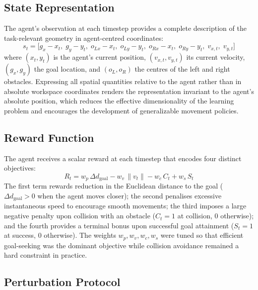 \documentclass{article}
\begin{document}
\subsection{State Representation}

The agent's observation at each timestep provides a complete description
of the task-relevant geometry in agent-centred coordinates:
\begin{equation}
  s_t = \bigl[
    g_x - x_t,\;g_y - y_t,\;
    o_{Lx} - x_t,\;o_{Ly} - y_t,\;
    o_{Rx} - x_t,\;o_{Ry} - y_t,\;
    v_{x,t},\;v_{y,t}
  \bigr]
  \label{eq:state}
\end{equation}
where $(x_t,y_t)$ is the agent's current position, $(v_{x,t},v_{y,t})$
its current velocity, $(g_x,g_y)$ the goal location, and $(o_L,o_R)$ the
centres of the left and right obstacles.
Expressing all spatial quantities relative to the agent rather than in
absolute workspace coordinates renders the representation invariant to the
agent's absolute position, which reduces the effective dimensionality of
the learning problem and encourages the development of generalizable
movement policies.

\subsection{Reward Function}

The agent receives a scalar reward at each timestep that encodes four
distinct objectives:
\begin{equation}
  R_t = w_p\,\Delta d_{\mathrm{goal}}
        - w_v\,\|v_t\|
        - w_c\,C_t
        + w_s\,S_t
  \label{eq:reward}
\end{equation}
The first term rewards reduction in the Euclidean distance to the goal
($\Delta d_{\mathrm{goal}} > 0$ when the agent moves closer);
the second penalises excessive instantaneous speed to encourage smooth
movements;
the third imposes a large negative penalty upon collision with an obstacle
($C_t = 1$ at collision, $0$ otherwise);
and the fourth provides a terminal bonus upon successful goal attainment
($S_t = 1$ at success, $0$ otherwise).
The weights $w_p, w_v, w_c, w_s$ were tuned so that efficient goal-seeking
was the dominant objective while collision avoidance remained a hard
constraint in practice.

\subsection{Perturbation Protocol}
\end{document}
